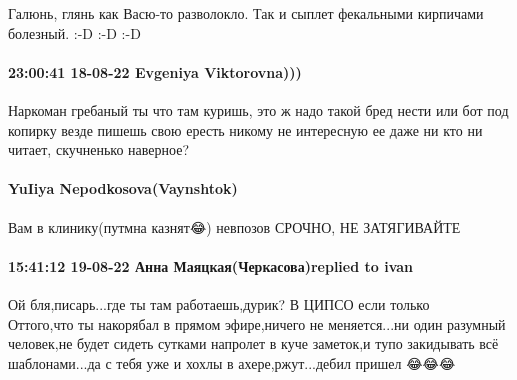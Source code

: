 Галюнь, глянь как Васю-то разволокло. Так и сыплет фекальными кирпичами
болезный. :-D :-D :-D

\paragraph{23:00:41 18-08-22 Evgeniya Viktorovna)))}

Наркоман гребаный ты что там куришь, это ж надо такой бред нести или бот под
копирку везде пишешь свою ересть никому не интересную ее даже ни кто ни читает,
скучненько наверное?

\paragraph{YuIiya Nepodkosova(Vaynshtok)}

Вам в клинику(путмна казнят😂) невпозов СРОЧНО, НЕ ЗАТЯГИВАЙТЕ

\paragraph{15:41:12 19-08-22 Анна Маяцкая(Черкасова)replied to ivan}

Ой бля,писарь...где ты там работаешь,дурик? В ЦИПСО если только 🤣🤣🤣
Оттого,что ты накорябал в прямом эфире,ничего не меняется...ни один разумный
человек,не будет сидеть сутками напролет в куче заметок,и тупо закидывать всё
шаблонами...да с тебя уже и хохлы в ахере,ржут...дебил пришел 😂😂😂
